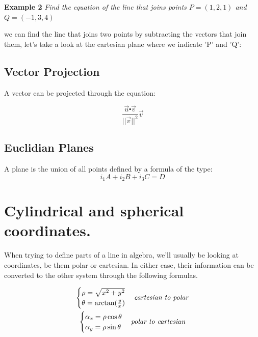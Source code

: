 \documentclass[11pt,fleqn]{book} %
\begin{document}
\textbf{Example 2}
\textit{Find the equation of the line that joins points $P=(1,2,1)$ and
$ Q=(-1,3,4) $}

we can find the line that joins two points by subtracting the vectors that join them, let's take a look at the 
cartesian plane where we indicate 'P' and 'Q':

\subsection{Vector Projection}

A vector can be projected through the equation:

\begin{equation}
    \frac{\vec{u} \centerdot \vec{v}}{||\vec{v}||^2} \vec{v}
\end{equation}

\subsection{Euclidian Planes}

A plane is the union of all points defined by a formula of the type:
\begin{equation}
    i_1 A + i_2 B + i_3 C = D
\end{equation}

\section{Cylindrical and spherical coordinates.}

When trying to define parts of a line in algebra, we'll usually be looking at
coordinates, be them polar or cartesian. In either case, their information can be 
converted to the other system through the following formulas.

\begin{gather}
    \begin{cases}
        \rho = \sqrt{x^2+y^2} \\
        \theta = \arctan(\frac{y}{x})
    \end{cases}
    \text{\textit{cartesian to polar}}\\
    \begin{cases}
        \alpha_x = \rho \cos \theta \\
        \alpha_y = \rho \sin \theta
    \end{cases}
    \text{\textit{polar to cartesian}}
\end{gather}
\end{document}
